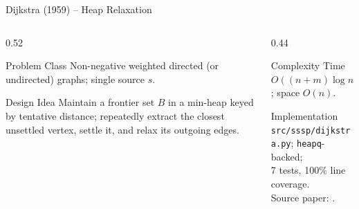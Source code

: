 \documentclass[aspectratio=169]{beamer}
\begin{document}
\begin{frame}{Dijkstra (1959) -- Heap Relaxation}
  \begin{columns}[T]
    \begin{column}{0.52\textwidth}
      \begin{block}{Problem Class}
        Non-negative weighted directed (or undirected) graphs; single source $s$.
      \end{block}
      \begin{block}{Design Idea}
        Maintain a frontier set $B$ in a min-heap keyed by tentative distance; repeatedly extract the closest unsettled vertex, settle it, and relax its outgoing edges.
      \end{block}
    \end{column}
    \begin{column}{0.44\textwidth}
      \begin{exampleblock}{Complexity}
        Time $O((n+m) \log n)$; space $O(n)$.
      \end{exampleblock}
      \begin{alertblock}{Implementation}
        \texttt{src/sssp/dijkstra.py}; \texttt{heapq}-backed;\\7 tests, 100\% line coverage.
        \\Source paper: \cite{dijkstra1959note}.
      \end{alertblock}
    \end{column}
  \end{columns}
\end{frame}
\end{document}
